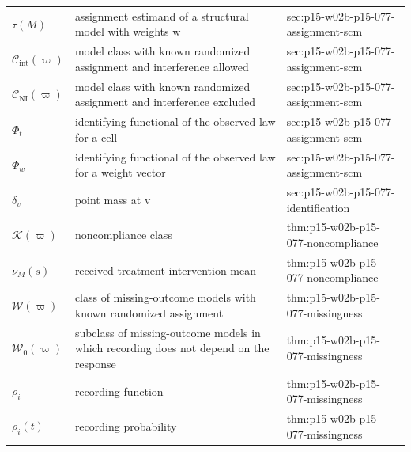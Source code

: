 \begin{longtable}{@{}p{}p{}p{}@{}}
\(\tau(M)\) & assignment estimand of a structural model with weights w & sec:\allowbreak{}p15-\allowbreak{}w02b-\allowbreak{}p15-\allowbreak{}077-\allowbreak{}assignment-\allowbreak{}scm \\
\(\mathcal C_{\mathrm{int}}(\varpi)\) & model class with known randomized assignment and interference allowed & sec:\allowbreak{}p15-\allowbreak{}w02b-\allowbreak{}p15-\allowbreak{}077-\allowbreak{}assignment-\allowbreak{}scm \\
\(\mathcal C_{\mathrm{NI}}(\varpi)\) & model class with known randomized assignment and interference excluded & sec:\allowbreak{}p15-\allowbreak{}w02b-\allowbreak{}p15-\allowbreak{}077-\allowbreak{}assignment-\allowbreak{}scm \\
\(\Phi_t\) & identifying functional of the observed law for a cell & sec:\allowbreak{}p15-\allowbreak{}w02b-\allowbreak{}p15-\allowbreak{}077-\allowbreak{}assignment-\allowbreak{}scm \\
\(\Phi_w\) & identifying functional of the observed law for a weight vector & sec:\allowbreak{}p15-\allowbreak{}w02b-\allowbreak{}p15-\allowbreak{}077-\allowbreak{}assignment-\allowbreak{}scm \\
\(\delta_v\) & point mass at v & sec:\allowbreak{}p15-\allowbreak{}w02b-\allowbreak{}p15-\allowbreak{}077-\allowbreak{}identification \\
\(\mathcal K(\varpi)\) & noncompliance class & thm:\allowbreak{}p15-\allowbreak{}w02b-\allowbreak{}p15-\allowbreak{}077-\allowbreak{}noncompliance \\
\(\nu_M(s)\) & received-treatment intervention mean & thm:\allowbreak{}p15-\allowbreak{}w02b-\allowbreak{}p15-\allowbreak{}077-\allowbreak{}noncompliance \\
\(\mathcal W(\varpi)\) & class of missing-outcome models with known randomized assignment & thm:\allowbreak{}p15-\allowbreak{}w02b-\allowbreak{}p15-\allowbreak{}077-\allowbreak{}missingness \\
\(\mathcal W_0(\varpi)\) & subclass of missing-outcome models in which recording does not depend on the response & thm:\allowbreak{}p15-\allowbreak{}w02b-\allowbreak{}p15-\allowbreak{}077-\allowbreak{}missingness \\
\(\rho_i\) & recording function & thm:\allowbreak{}p15-\allowbreak{}w02b-\allowbreak{}p15-\allowbreak{}077-\allowbreak{}missingness \\
\(\bar\rho_i(t)\) & recording probability & thm:\allowbreak{}p15-\allowbreak{}w02b-\allowbreak{}p15-\allowbreak{}077-\allowbreak{}missingness \\

\end{longtable}
